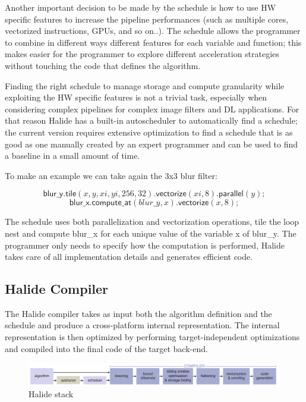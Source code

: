 \documentclass[../main.tex]{subfiles}
\begin{document}
Another important decision to be made by the schedule is how to use HW specific features to increase the pipeline performances (such as multiple cores, vectorized instructions, GPUs, and so on..). The schedule allows the programmer to combine in different ways different features for each variable and function; this makes easier for the programmer to explore different acceleration strategies without touching the code that defines the algorithm.

Finding the right schedule to manage storage and compute granularity while exploiting the HW specific features is not a trivial task, especially when considering complex pipelines for complex image filters and DL applications. For that reason Halide has a built-in autoscheduler \cite{halideAutoscheduler} to automatically find a schedule; the current version requires extensive optimization to find a schedule that is as good as one manually created by an expert programmer and can be used to find a baseline in a small amount of time.

To make an example we can take again the 3x3 blur filter:

\[ \mathsf{blur\_y.tile}(x, y, xi, yi, 256, 32)\mathsf{.vectorize}(xi, 8)\mathsf{.parallel}(y);\]
\[ \mathsf{blur\_x.compute\_at}(blur\_y, x)\mathsf{.vectorize}(x, 8);\]

The schedule uses both parallelization and vectorization operations, tile the loop nest and compute blur\_x for each unique value of the variable x of blur\_y. The programmer only needs to specify how the computation is performed, Halide takes care of all implementation details and generates efficient code.

\subsection{Halide Compiler}

The Halide compiler \cite{halide1} takes as input both the algorithm definition and the schedule and produce a cross-platform internal representation. The internal representation is then optimized by performing target-independent optimizations and compiled into the final code of the target back-end.

\begin{figure}[h!]
  \includegraphics[width=1\textwidth]{images/HalideCompilerStack.png}
  \centering
  \caption{Halide stack \cite{halide1} }
  \label{fig:HalideStack}
\end{figure}
\end{document}
